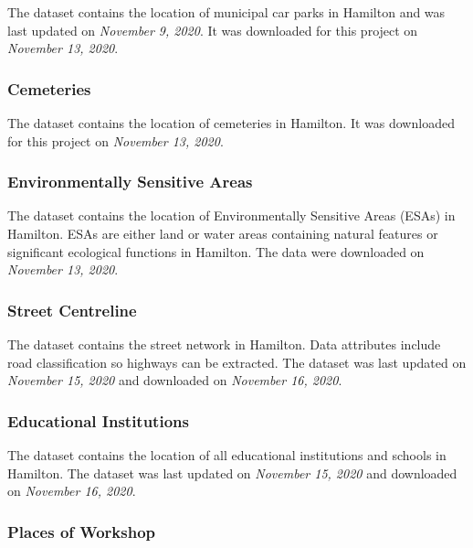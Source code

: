 \documentclass[
]{article}
\begin{document}
The dataset contains the location of municipal car parks in Hamilton and
was last updated on \emph{November 9, 2020}. It was downloaded for this
project on \emph{November 13, 2020}.

\hypertarget{cemeteries}{%
\subsubsection{Cemeteries}\label{cemeteries}}

The dataset contains the location of cemeteries in Hamilton. It was
downloaded for this project on \emph{November 13, 2020}.

\hypertarget{environmentally-sensitive-areas}{%
\subsubsection{Environmentally Sensitive
Areas}\label{environmentally-sensitive-areas}}

The dataset contains the location of Environmentally Sensitive Areas
(ESAs) in Hamilton. ESAs are either land or water areas containing
natural features or significant ecological functions in Hamilton. The
data were downloaded on \emph{November 13, 2020}.

\hypertarget{street-centreline}{%
\subsubsection{Street Centreline}\label{street-centreline}}

The dataset contains the street network in Hamilton. Data attributes
include road classification so highways can be extracted. The dataset
was last updated on \emph{November 15, 2020} and downloaded on
\emph{November 16, 2020}.

\hypertarget{educational-institutions}{%
\subsubsection{Educational
Institutions}\label{educational-institutions}}

The dataset contains the location of all educational institutions and
schools in Hamilton. The dataset was last updated on \emph{November 15,
2020} and downloaded on \emph{November 16, 2020}.

\hypertarget{places-of-workshop}{%
\subsubsection{Places of Workshop}\label{places-of-workshop}}
\end{document}
